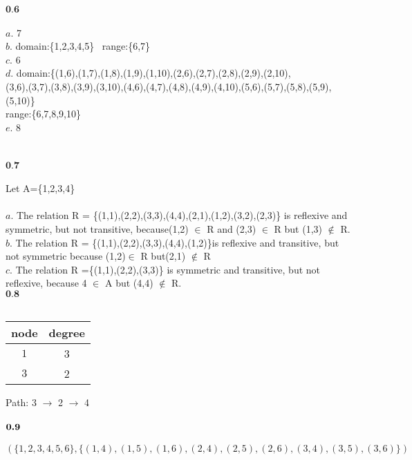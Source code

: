 \documentclass{scrartcl}
\begin{document}
\noindent$\textbf{0.6}$
\\
\\
$a.\,\,$7\\
$b.\,\,$domain:\{1,2,3,4,5\}\,\,\,\,\,range:\{6,7\}\\
$c.\,\,$6\\
$d.\,\,$domain:\{(1,6),(1,7),(1,8),(1,9),(1,10),(2,6),(2,7),(2,8),(2,9),(2,10),\\
(3,6),(3,7),(3,8),(3,9),(3,10),(4,6),(4,7),(4,8),(4,9),(4,10),(5,6),(5,7),(5,8),(5,9),(5,10)\}\\
\indent{}range:\{6,7,8,9,10\}\\
$e.\,\,$8\\
\\
\\
$\textbf{0.7}$
\\
\\
Let A=\{1,2,3,4\}\\ \\
$a.$ The relation R = \{(1,1),(2,2),(3,3),(4,4),(2,1),(1,2),(3,2),(2,3)\} is reflexive and symmetric, but not transitive, because(1,2) $\in$ R and (2,3) $\in$ R but (1,3) $\notin$ R. \\
$b.$ The relation R = \{(1,1),(2,2),(3,3),(4,4),(1,2)\}is reflexive
and transitive, but not symmetric because (1,2)$\in$ R but(2,1) $\notin$ R\\
$c.$ The relation R =\{(1,1),(2,2),(3,3)\} is symmetric and transitive, but not reflexive, because 4 $\in$ A but (4,4) $\notin$ R. \\

\noindent$\textbf{0.8}$
\\
\\

\begin{center}
 \begin{tabular}{||c c ||}
 \hline
  node 	& degree		\\ [0.5ex] 
 \hline
 $1$ 		& 3	\\
 \hline
 $3$ 		& 2	\\
 \hline
\end{tabular}
\end{center}

Path: 3 $\to$ 2 $\to$ 4
\\
\\
$\noindent\textbf{0.9}$
\\
\\
$(\{1,2,3,4,5,6\},\{(1,4),(1,5),(1,6),(2,4),(2,5),(2,6),(3,4),(3,5),(3,6)\})$
\end{document}
